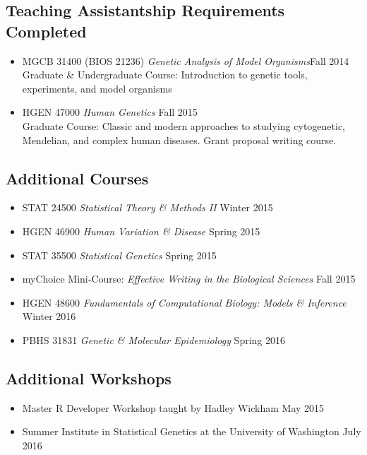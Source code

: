 \documentclass[a4paper, 11pt]{article}
\begin{document}
\subsection*{Teaching Assistantship Requirements Completed}
\begin{itemize}
    \item MGCB 31400 (BIOS 21236) \emph{Genetic Analysis of Model Organisms}\hfill Fall 2014\\
Graduate \& Undergraduate Course: Introduction to genetic tools, experiments, and model organisms 

	\item HGEN 47000 \emph{Human Genetics} \hfill Fall 2015\\
Graduate Course: Classic and modern approaches to studying cytogenetic, Mendelian, and complex human diseases. Grant proposal writing course. 
\end{itemize}


\subsection*{Additional Courses}
\begin{itemize}
    \item STAT 24500 \emph{Statistical Theory \& Methods II }\hfill Winter 2015
    \item HGEN 46900 \emph{Human Variation \& Disease} \hfill Spring 2015
    \item STAT 35500 \emph{Statistical Genetics} \hfill Spring 2015
    \item myChoice Mini-Course: \emph{Effective Writing in the Biological Sciences} \hfill Fall 2015
    \item HGEN 48600 \emph{Fundamentals of Computational Biology: Models \& Inference} \hfill Winter 2016
    \item PBHS 31831 \emph{Genetic \& Molecular Epidemiology} \hfill Spring 2016
  
	
\end{itemize}

\subsection*{Additional Workshops}
\begin{itemize}
   \item Master R Developer Workshop taught by Hadley Wickham \hfill May 2015
     \item Summer Institute in Statistical Genetics at the University of Washington \hfill July 2016
\end{itemize}
\end{document}
